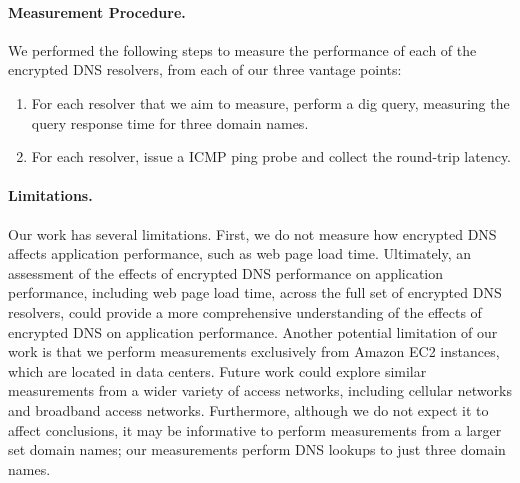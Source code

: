 \paragraph{Measurement Procedure.} We performed the following steps to measure
the performance of each of the encrypted DNS resolvers, from each of our three vantage points:
\begin{enumerate} 
        \item For each resolver that we aim to measure, perform a dig query, measuring the query response time for three
            domain names.
    \item For each resolver, issue a ICMP ping
            probe and collect the round-trip latency. 
\end{enumerate}

\paragraph{Limitations.} Our work has several limitations.
First, we do not measure how encrypted DNS affects application
performance, such as web page load time. Ultimately, an assessment of the
effects of encrypted DNS performance on application performance, including web
page load time, across the full set of encrypted DNS resolvers, could provide
a more comprehensive understanding of the effects of encrypted DNS on
application performance.  Another potential limitation of our work is that we
perform measurements exclusively from Amazon EC2 instances, which are located
in data centers. Future work could explore similar measurements from a wider
variety of access networks, including cellular networks and broadband access
networks.  Furthermore, although we do not expect it to affect conclusions, it may
be informative to perform measurements from a larger set domain names; our
measurements perform DNS lookups to just three domain names.
